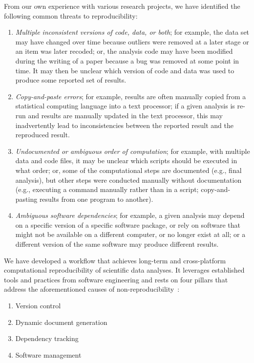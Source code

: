\documentclass[psych,tutorial,accept,moreauthors,pdftex]{Definitions/mdpi}
\begin{document}
From our own experience with various research projects, we have
identified the following common threats to reproducibility:

\begin{enumerate}
\def\labelenumi{\arabic{enumi}.}
\item
  {\emph{Multiple inconsistent versions of code, data, or both};}
 for
  example, the data set may have changed over time because outliers were
  removed at a later stage or an item was later recoded; or, the
  analysis code may have been modified during the writing of a paper
  because a bug was removed at some point in time. It may then be
  unclear which version of code and data was used to produce some
  reported set of results.
\item
  {\emph{Copy-and-paste errors};} for example, results are often manually
  copied from a statistical computing language into a text processor; if
  a given analysis is re-run and results are manually updated in the
  text processor, this may inadvertently lead to inconsistencies between
  the reported result and the reproduced result.
\item
  {\emph{Undocumented or ambiguous order of computation};} for example,
  with multiple data and code files, it may be unclear which scripts
  should be executed in what order; or, some of the computational steps
  are documented (e.g., final analysis), but other steps were conducted
  manually without documentation (e.g., executing a command manually
  rather than in a script; copy-and-pasting results from one program to
  another).
\item
  {\emph{Ambiguous software dependencies};} for example, a given analysis
  may depend on a specific version of a specific software package, or
  rely on software that might not be available on a different computer,
  or no longer exist at all; or a different version of the same software
  may produce different results.
\end{enumerate}

We have developed a workflow that achieves long-term and cross-platform
computational reproducibility of scientific data analyses. It leverages
established tools and practices from software engineering and rests on
four pillars that address the aforementioned causes of
non-reproducibility~\citep{Peikert2019}:

\begin{enumerate}
\item  Version control
\item  Dynamic document generation
\item  Dependency tracking
\item  Software management
\end{enumerate}
\end{document}

